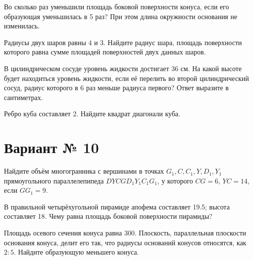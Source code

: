 \documentclass[4apaper]{article}
\begin{document}
\begin{taskBN}{3}
Во сколько раз уменьшили площадь боковой поверхности конуса, если его образующая уменьшилась в 5 раз? При этом длина окружности основания не изменилась.
\end{taskBN}

\begin{taskBN}{4}
Радиусы двух шаров равны $4$ и $3$. Найдите радиус шара, площадь поверхности которого равна сумме площадей поверхностей двух данных шаров.
\end{taskBN}

\begin{taskBN}{5}
В цилиндрическом сосуде уровень жидкости достигает 36 см. На какой высоте будет находиться уровень жидкости, если её перелить во второй цилиндрический сосуд, радиус которого в 6 раз меньше радиуса первого? Ответ выразите в сантиметрах.
\end{taskBN}

\begin{taskBN}{6}
Ребро куба составляет 2. Найдите квадрат диагонали куба.
\end{taskBN}
\newpage\section*{Вариант № 10}

\begin{taskBN}{1}
Найдите объём многогранника с вершинами в точках $G_1,C,C_1,Y,D_1,Y_1$ прямоугольного параллелепипеда $DYCGD_1Y_1C_1G_1$, у которого $CG = 6$, $YC = 14$, если $GG_1=9$. 
\end{taskBN}

\begin{taskBN}{2}
В правильной четырёхугольной пирамиде апофема составляет 19.5; высота составляет 18. Чему равна площадь боковой поверхности пирамиды?
\end{taskBN}

\begin{taskBN}{3}
Площадь осевого сечения конуса равна $300$. Плоскость, параллельная плоскости основания конуса,  делит его так, что радиусы оснований конусов относятся, как $2:5$. Найдите образующую меньшего конуса. 
\end{taskBN}
\end{document}
